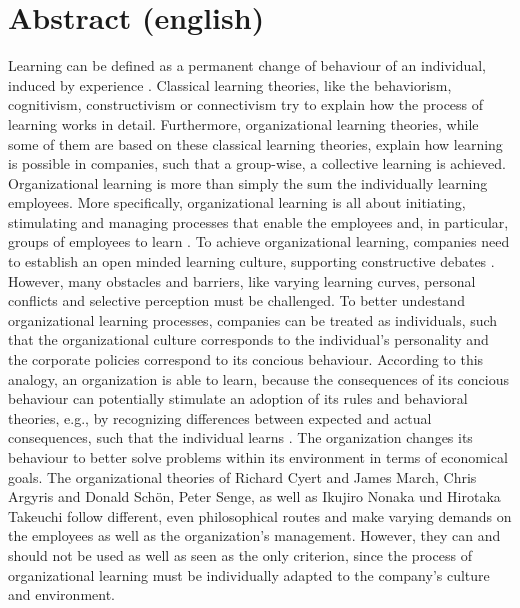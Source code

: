 \documentclass[12pt]{article}
\begin{document}
\section{Abstract (english)}

Learning can be defined as a permanent change of behaviour of an individual,
induced by experience \cite{Lefrancois:2006}. Classical learning theories, like
the behaviorism, cognitivism, constructivism or connectivism try to explain how
the process of learning works in detail. Furthermore, organizational learning
theories, while some of them are based on these classical learning theories,
explain how learning is possible in companies, such that a group-wise, a
collective learning is achieved. Organizational learning is more than simply
the sum the individually learning employees. More specifically, organizational
learning is all about initiating, stimulating and managing processes that
enable the employees and, in particular, groups of employees to learn
\cite{Franken:2002}. To achieve organizational learning, companies need to
establish an open minded learning culture, supporting constructive debates
\cite{culture}. However, many obstacles and barriers, like varying learning
curves, personal conflicts and selective perception must be challenged.  To
better undestand organizational learning processes, companies can be treated as
individuals, such that the organizational culture corresponds to the
individual's personality and the corporate policies correspond to its concious
behaviour. According to this analogy, an organization is able to learn, because
the consequences of its concious behaviour can potentially stimulate an
adoption of its rules and behavioral theories, e.g., by recognizing
differences between expected and actual consequences, such that the individual
learns \cite{Pawlowsky:1992}. The organization changes its behaviour to better
solve problems within its environment in terms of economical goals. The
organizational theories of Richard Cyert and James March, Chris Argyris and
Donald Schön, Peter Senge, as well as Ikujiro Nonaka und Hirotaka Takeuchi
follow different, even philosophical routes and make varying demands on the
employees as well as the organization's management. However, they can and
should not be used as well as seen as the only criterion, since the process of
organizational learning must be individually adapted to the company's culture
and environment.

\nocite{*}


\end{document}
